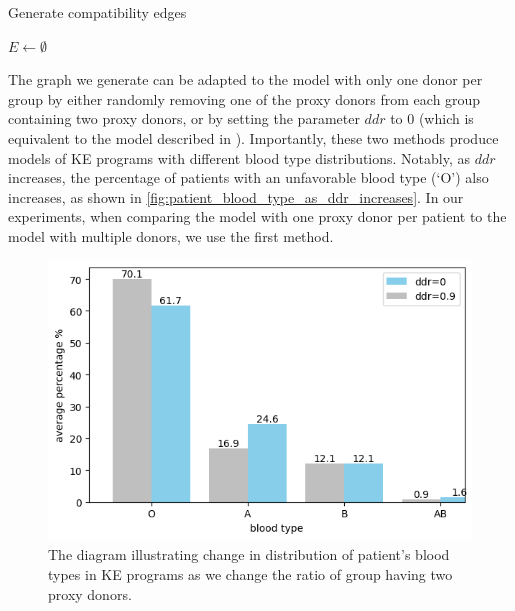 \begin{algorithm}
    \caption{Generate compatibility edges}
    \label{alg:generate_compatibility_edges}


    $E \gets \emptyset$\;

\end{algorithm}

The graph we generate can be adapted to the model with only one donor per group by either randomly removing one of the proxy donors from each group containing two proxy donors, or by setting the parameter $ddr$ to $0$ (which is equivalent to the model described in \cite{toulis2011random}). Importantly, these two methods produce models of \ac{KE} programs with different blood type distributions. Notably, as $ddr$ increases, the percentage of patients with an unfavorable blood type (‘O’) also increases, as shown in \autoref{fig:patient_blood_type_as_ddr_increases}. In our experiments, when comparing the model with one proxy donor per patient to the model with multiple donors, we use the first method.

\begin{figure}[H]
    \centering
    \includegraphics[width=1.\linewidth]{data/patient_blood_type_as_ddr_increases.png}
    \caption[Distribution of patient's blood types as double donor ratio changes]{The diagram illustrating change in distribution of patient's blood types in \ac{KE} programs as we change the ratio of group having two proxy donors.}
    \label{fig:patient_blood_type_as_ddr_increases}
\end{figure}


